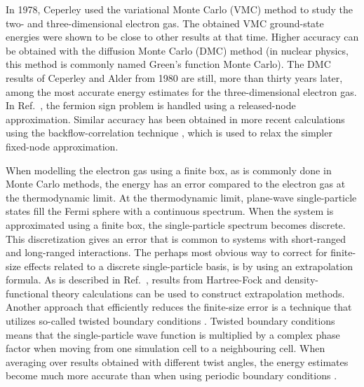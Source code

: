 \documentclass[aps,twocolumn,showpacs,floatfix,nofootinbib,preprintnumbers,superscriptaddress,amsmath,amssymb]{revtex4-1}
\begin{document}
In 1978, Ceperley used \cite{ceperley1978} 
the variational Monte Carlo (VMC) method to 
study the two- and three-dimensional electron gas. The
obtained VMC ground-state energies were shown to be close
to other results at that time. Higher accuracy can be obtained with
the diffusion Monte Carlo (DMC) method (in nuclear physics,
this method is commonly named Green's function Monte Carlo). 
The DMC results of Ceperley and Alder from 1980 
\cite{ceperley1980} are still, more than thirty years later, 
among the most accurate energy estimates for the 
three-dimensional electron gas. In Ref.~\cite{ceperley1980},
the fermion sign problem is handled using 
a released-node approximation. Similar accuracy has been 
obtained in more recent calculations using the 
backflow-correlation technique \cite{kwon1998}, which is used 
to relax the simpler fixed-node approximation. 

When modelling the electron gas using a finite box, as is
commonly done in Monte Carlo methods, the energy has an error
compared to the electron gas at the thermodynamic limit. 
At the thermodynamic limit, plane-wave single-particle states
fill the Fermi sphere with a continuous spectrum. When the
system is approximated using a finite box, the 
single-particle spectrum becomes discrete. This 
discretization gives an 
error that is common to systems with short-ranged and 
long-ranged interactions. The perhaps most obvious way to
correct for finite-size effects related to a discrete 
single-particle basis, is by using an extrapolation formula.
As is described in Ref.~\cite{drummond2008}, results from
Hartree-Fock and density-functional theory calculations 
can be used to construct extrapolation methods. Another
approach that efficiently reduces the finite-size error
is a technique that utilizes so-called twisted boundary 
conditions \cite{lin2001}. Twisted boundary conditions 
means that the single-particle wave function is 
multiplied by a complex phase factor when moving from one 
simulation cell to a neighbouring cell. When averaging
over results obtained with different twist angles, the
energy estimates become much more accurate than when
using periodic boundary conditions \cite{lin2001}. 
\end{document}
